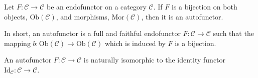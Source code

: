 \documentclass[12pt]{article}
\begin{document}
Let $F\colon \mathcal{C}\to \mathcal{C}$ be an endofunctor on a category $\mathcal{C}$.  If $F$ is a bijection on both objects, $\mathrm{Ob}(\mathcal{C})$, and morphisms, $\mathrm{Mor}(\mathcal{C})$, then it is an autofunctor.

In short, an autofunctor is a full and faithful endofunctor $F\colon \mathcal{C}\to \mathcal{C}$ such that the mapping $b: \mathrm{Ob}(\mathcal{C})\to \mathrm{Ob}(\mathcal{C})$ which is induced by $F$ is a bijection.

An autofunctor $F\colon \mathcal{C}\to\mathcal{C}$ is naturally isomorphic to the identity functor $\mathrm{Id}_{\mathcal{C}}: \mathcal{C} \to \mathcal{C}$.
\end{document}
